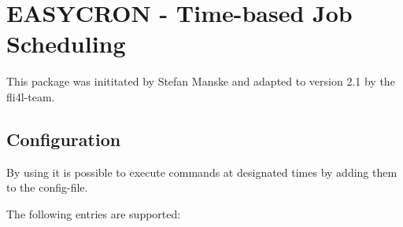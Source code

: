 
{
\section {EASYCRON - Time-based Job Scheduling}
}

This package was inititated by Stefan Manske
 and adapted to version 2.1 by 
the fli4l-team.


\subsection{Configuration}


       By using  it is possible to execute commands 
       at designated times by adding them to the config-file. 

       The following entries are supported:



